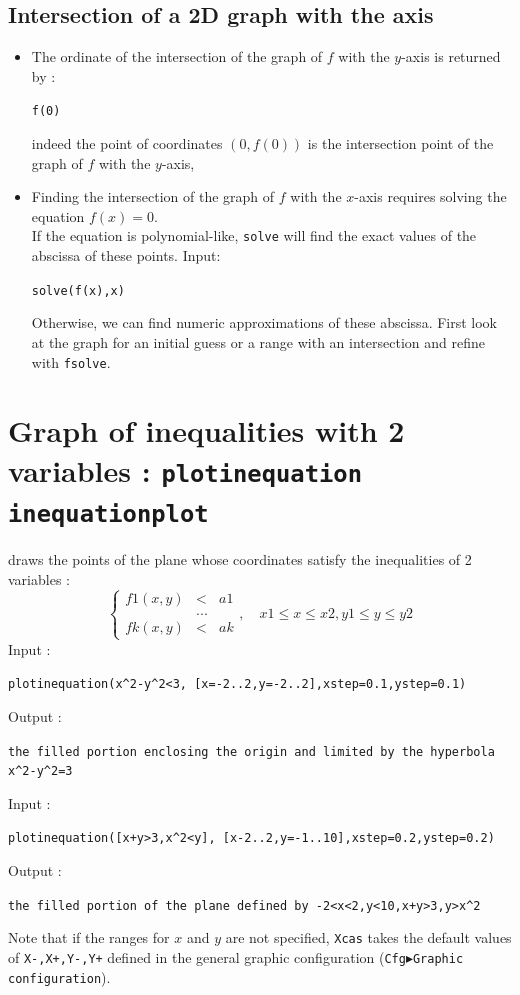 \documentclass[a4paper,11pt]{book}
\begin{document}
\subsection{Intersection of a 2D graph with the axis}
\begin{itemize}
\item The ordinate of the intersection of the graph of $f$ with the 
$y$-axis is returned by :
\begin{center}{\tt f(0)}\end{center}
indeed the point of coordinates $(0,f(0))$ is the intersection point of the 
graph of $f$ with the $y$-axis,
\item Finding the intersection of the graph of $f$ with the $x$-axis 
requires solving the equation $f(x)=0$. \\
If the equation is polynomial-like, {\tt solve} will find
the exact values of the abscissa of these points. Input:
\begin{center}{\tt solve(f(x),x)}\end{center}
Otherwise, we can find numeric approximations of these 
abscissa. First look at the graph for an initial guess or a
range with an intersection and refine with {\tt fsolve}.
\end{itemize}

\section{Graph of inequalities with 2 variables : {\tt plotinequation inequationplot}}
draws the points of the plane whose coordinates
satisfy the inequalities of 2 variables :
\[ \left\{ \begin{array}{ccc}
f1(x,y) &<&a1 \\
& ... & \\
fk(x,y)&<&ak 
\end{array}\right., \quad
x1\leq x \leq x2, y1 \leq y \leq y2 \]
Input :
\begin{center}{\tt plotinequation(x\verb|^|2-y\verb|^|2<3, [x=-2..2,y=-2..2],xstep=0.1,ystep=0.1)}\end{center}
Output :
\begin{center}{\tt the filled portion enclosing the origin and limited by the hyperbola x\verb|^|2-y\verb|^|2=3}\end{center}
Input :
\begin{center}{\tt plotinequation([x+y>3,x\verb|^|2<y], [x-2..2,y=-1..10],xstep=0.2,ystep=0.2)}\end{center}
Output :
\begin{center}{\tt the filled portion of the plane defined by -2<x<2,y<10,x+y>3,y>x\verb|^|2}\end{center}
Note that if the ranges for $x$ and $y$ are not specified, 
{\tt Xcas} takes the default values of 
{\tt X-,X+,Y-,Y+} defined in the general graphic configuration
({\tt Cfg$\blacktriangleright$Graphic configuration}).
\end{document}
